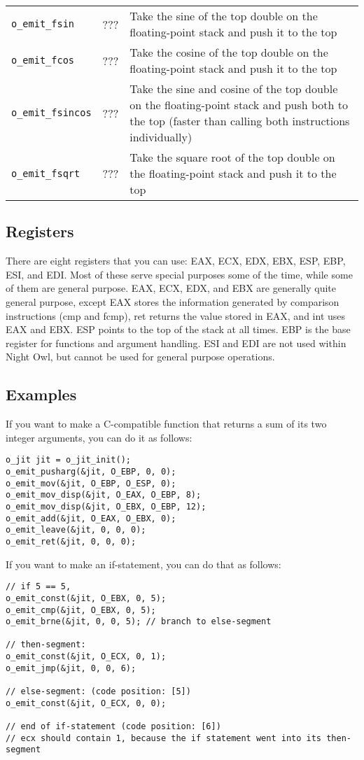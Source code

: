 \documentclass[10pt,a4paper]{article}
\begin{document}
{\begin{tabular}{l l p{10cm}}
\verb|o_emit_fsin| & ??? & Take the sine of the top double on the floating-point stack and push it to the top \\
\verb|o_emit_fcos| & ??? & Take the cosine of the top double on the floating-point stack and push it to the top \\
\verb|o_emit_fsincos| & ??? & Take the sine and cosine of the top double on the floating-point stack and push both to the top (faster than calling both instructions individually) \\
\verb|o_emit_fsqrt| & ??? & Take the square root of the top double on the floating-point stack and push it to the top \\
\hline
\end{tabular}
}

\subsection{Registers}
There are eight registers that you can use: EAX, ECX, EDX, EBX, ESP, EBP, ESI, and EDI. Most of these serve special purposes some of the time, while some of them are general purpose. EAX, ECX, EDX, and EBX are generally quite general purpose, except EAX stores the information generated by comparison instructions (cmp and fcmp), ret returns the value stored in EAX, and int uses EAX and EBX. ESP points to the top of the stack at all times. EBP is the base register for functions and argument handling. ESI and EDI are not used within Night Owl, but cannot be used for general purpose operations. 

\subsection{Examples}
If you want to make a C-compatible function that returns a sum of its two integer arguments, you can do it as follows:
\begin{verbatim}
o_jit jit = o_jit_init();
o_emit_pusharg(&jit, O_EBP, 0, 0);
o_emit_mov(&jit, O_EBP, O_ESP, 0);
o_emit_mov_disp(&jit, O_EAX, O_EBP, 8);
o_emit_mov_disp(&jit, O_EBX, O_EBP, 12);
o_emit_add(&jit, O_EAX, O_EBX, 0);
o_emit_leave(&jit, 0, 0, 0);
o_emit_ret(&jit, 0, 0, 0);
\end{verbatim}

If you want to make an if-statement, you can do that as follows:
\begin{verbatim}
// if 5 == 5,
o_emit_const(&jit, O_EBX, 0, 5);
o_emit_cmp(&jit, O_EBX, 0, 5);
o_emit_brne(&jit, 0, 0, 5); // branch to else-segment

// then-segment:
o_emit_const(&jit, O_ECX, 0, 1);
o_emit_jmp(&jit, 0, 0, 6);

// else-segment: (code position: [5])
o_emit_const(&jit, O_ECX, 0, 0);

// end of if-statement (code position: [6])
// ecx should contain 1, because the if statement went into its then-segment
\end{verbatim}
\end{document}
